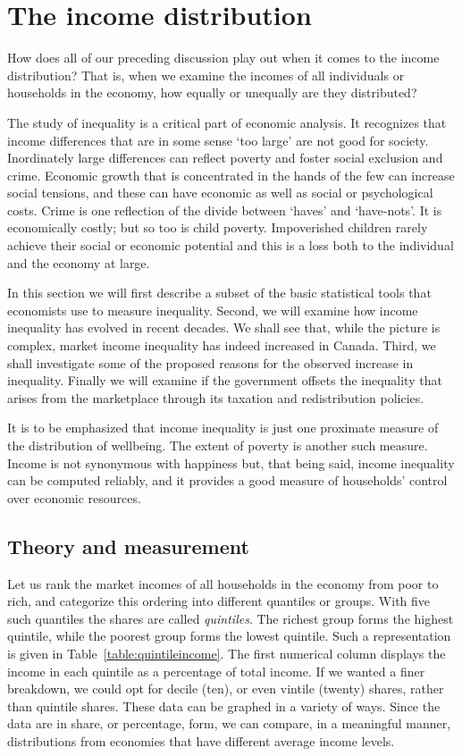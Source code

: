 \section{The income distribution}\label{sec:ch13sec7}

How does all of our preceding discussion play out when it comes to the
income distribution? That is, when we examine the incomes of all individuals
or households in the economy, how equally or unequally are they distributed?

The study of inequality is a critical part of economic analysis. It
recognizes that income differences that are in some sense `too large' are
not good for society. Inordinately large differences can reflect poverty and
foster social exclusion and crime. Economic growth that is concentrated in
the hands of the few can increase social tensions, and these can have
economic as well as social or psychological costs. Crime is one reflection
of the divide between `haves' and `have-nots'. It is economically costly;
but so too is child poverty. Impoverished children rarely achieve their
social or economic potential and this is a loss both to the individual and the
economy at large.

In this section we will first describe a subset of the basic statistical
tools that economists use to measure inequality. Second, we will examine how
income inequality has evolved in recent decades. We shall see that, while
the picture is complex, market income inequality has indeed increased in
Canada. Third, we shall investigate some of the proposed reasons for the
observed increase in inequality. Finally we will examine if the government
offsets the inequality that arises from the marketplace through its taxation
and redistribution policies.

It is to be emphasized that income inequality is just one proximate measure
of the distribution of wellbeing. The extent of poverty is another such
measure. Income is not synonymous with happiness but, that being said,
income inequality can be computed reliably, and it provides a good measure
of households' control over economic resources.

\newhtmlpage

\subsection*{Theory and measurement}

Let us rank the market incomes of
all households in the economy from poor to rich, and categorize this
ordering into different quantiles or groups. With five such quantiles the
shares are called \textit{quintiles}. The richest group forms the highest
quintile, while the poorest group forms the lowest quintile. Such a
representation is given in Table~\ref{table:quintileincome}. The first
numerical column displays the income in each quintile as a percentage of
total income. If we wanted a finer breakdown, we could opt for decile (ten),
or even vintile (twenty) shares, rather than quintile shares. These data can
be graphed in a variety of ways. Since the data are in share, or percentage,
form, we can compare, in a meaningful manner, distributions from economies
that have different average income levels.

